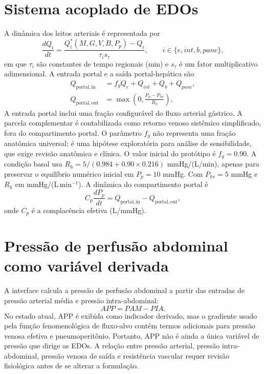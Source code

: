 \documentclass[11pt,a4paper]{article}
\begin{document}
\section{Sistema acoplado de EDOs}
A dinâmica dos leitos arteriais é representada por
\begin{equation}
\boxed{\frac{dQ_i}{dt}=\frac{Q_i^*(M,G,V,B,P_p)-Q_i}{\tau_i s_\tau}},
\qquad i\in\{e,int,b,panc\},
\end{equation}
em que $\tau_i$ são constantes de tempo regionais (min) e $s_\tau$ é um fator multiplicativo adimensional. A entrada portal e a saída portal-hepática são
\begin{align}
Q_{\mathrm{portal,in}}&=f_gQ_e+Q_{int}+Q_b+Q_{panc},\\
Q_{\mathrm{portal,out}}&=\max\left(0,\frac{P_p-P_{hv}}{R_h}\right),
\end{align}
A entrada portal inclui uma fração configurável do fluxo arterial gástrico. A parcela complementar é contabilizada como retorno venoso sistêmico simplificado, fora do compartimento portal. O parâmetro $f_g$ não representa uma fração anatômica universal: é uma hipótese exploratória para análise de sensibilidade, que exige revisão anatômica e clínica. O valor inicial do protótipo é $f_g=0.90$. A condição basal usa $R_h=5/(0.984+0.90\times0.216)$ mmHg/(L/min), apenas para preservar o equilíbrio numérico inicial em $P_p=10$ mmHg.
Com $P_{hv}=5$ mmHg e $R_h$ em mmHg/(L\,min$^{-1}$). A dinâmica do compartimento portal é
\begin{equation}
\boxed{C_p\frac{dP_p}{dt}=Q_{\mathrm{portal,in}}-Q_{\mathrm{portal,out}}},
\end{equation}
onde $C_p$ é a complacência efetiva (L/mmHg).

\section{Pressão de perfusão abdominal como variável derivada}
A interface calcula a pressão de perfusão abdominal a partir das entradas de pressão arterial média e pressão intra-abdominal:
\[
APP = PAM - PIA.
\]
No estado atual, APP é exibida como indicador derivado, mas o gradiente usado pela função fenomenológica de fluxo-alvo contém termos adicionais para pressão venosa efetiva e pneumoperitônio. Portanto, APP não é ainda a única variável de pressão que dirige as EDOs. A relação entre pressão arterial, pressão intra-abdominal, pressão venosa de saída e resistência vascular requer revisão fisiológica antes de se alterar a formulação.
\end{document}
